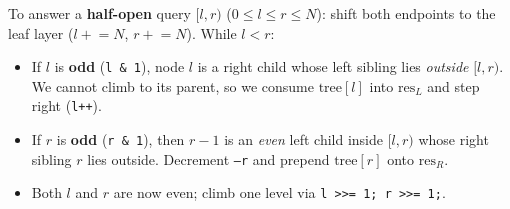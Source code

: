 \documentclass[11pt,a4paper]{article}
\theoremstyle{definition}
\begin{document}
To answer a \textbf{half-open} query $[l, r)$ ($0 \le l \le r \le N$): shift both endpoints to the leaf layer ($l \mathrel{+}= N$, $r \mathrel{+}= N$). While $l < r$:
\begin{itemize}[itemsep=2pt, topsep=2pt]
    \item If $l$ is \textbf{odd} (\texttt{l \& 1}), node $l$ is a right child whose left sibling lies \emph{outside} $[l, r)$. We cannot climb to its parent, so we consume $\text{tree}[l]$ into $\text{res}_L$ and step right (\texttt{l++}).
    \item If $r$ is \textbf{odd} (\texttt{r \& 1}), then $r - 1$ is an \emph{even} left child inside $[l, r)$ whose right sibling $r$ lies outside. Decrement \texttt{--r} and prepend $\text{tree}[r]$ onto $\text{res}_R$.
    \item Both $l$ and $r$ are now even; climb one level via \texttt{l >>= 1; r >>= 1;}.
\end{itemize}
\end{document}
